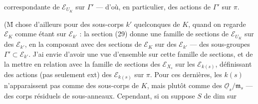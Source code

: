correspondante de $\mathcal E_{U_K}$ sur $\Gamma'$ --- d'où, en particulier, des actions de $\Gamma'$ sur $\pi$.

(\={M} chose d'ailleurs pour des sous-corps $k'$ quelconques de $K$, quand on regarde $\mathcal E_K$ comme étant sur $\mathcal E_{k'}$ : la section (29) donne une famille de sections de $\mathcal E_{U_K}$ sur des $\mathcal E_{k'}$,  en la composant avec des sections de $\mathcal E_K$ sur des $\mathcal E_{k'}$ --- des sous-groupes $\Gamma'\subset\mathcal E_{k'}$. J'ai envie d'avoir une vue d'ensemble sur cette famille de sections, et de la mettre en relation avec la famille de sections des $\mathcal E_{X_s}$ sur les $\mathcal E_{k(s)}$,  définissant des actions  (pas seulement ext) des $\mathcal E_{k(s)}$ sur $\pi$. Pour ces dernières, les $k(s)$ n'apparaissent pas comme des sous-corps de $K$, mais plutôt comme des $\underline{\mathcal O}_s/\mathfrak m_s$ --- des corps résiduels de sous-anneaux. Cependant, si on suppose $S$ de dim   sur
